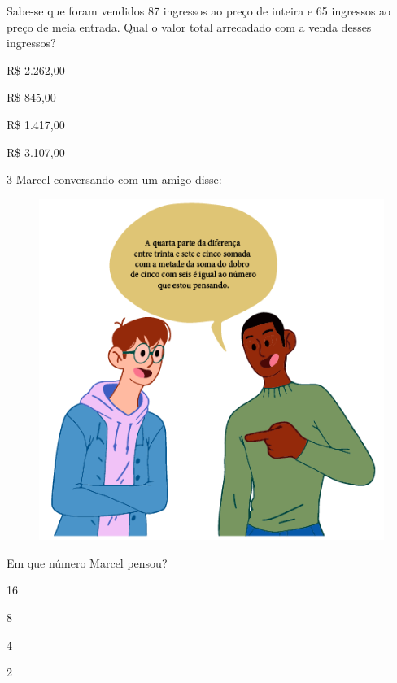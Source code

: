 Sabe-se que foram vendidos 87 ingressos ao preço de inteira e 65
ingressos ao preço de meia entrada. Qual o valor total arrecadado com a
venda desses ingressos?

\begin{minipage}{.5\textwidth}
\begin{escolha}
\item
  R\$ 2.262,00
\item
  R\$ 845,00
\item
  R\$ 1.417,00
\item
  R\$ 3.107,00
\end{escolha}
\end{minipage}

\pagebreak
\num{3} Marcel conversando com um amigo disse:

\begin{figure}[htpb!]
\centering
\includegraphics[width=.8\textwidth]{../ilustracoes/MAT5/SAEB_5ANO_MAT_figura94.png}
\end{figure}

Em que número Marcel pensou?

\begin{minipage}{.5\textwidth}
\begin{escolha}
\item
  16
\item
  8
\item
  4
\item
  2
\end{escolha}
\end{minipage}

